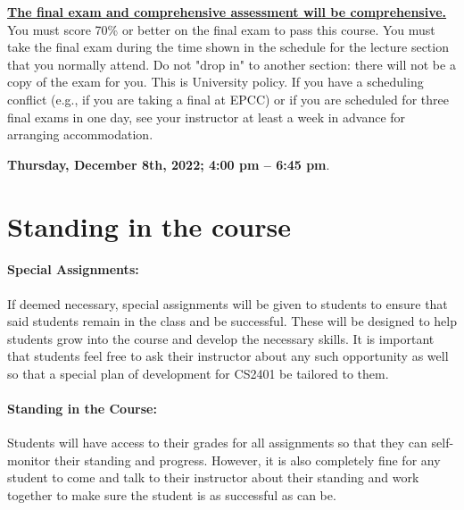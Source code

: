 \documentclass[12pt]{scrartcl}
\begin{document}
\textbf{\underline{The final exam and comprehensive assessment will be comprehensive.}}
You must score 70\% or better on the final exam to pass this course. 
You must take the final exam during the time shown in the schedule for the lecture section that you normally attend. 
Do not "drop in" to another section: there will not be a copy of the exam for you. 
This is University policy. If you have a scheduling conflict (e.g., if you are taking a final at EPCC) or if you are scheduled for three final exams in one day, see your instructor at least a week in advance for arranging accommodation.
\begin{tcolorbox}[colback=green!5,colframe=green!75!black,title=Final Exam Date]
\begin{center}
\textbf{Thursday, December 8th, 2022; 4:00 pm – 6:45 pm}.
 \end{center}
 \end{tcolorbox}

\section{Standing in the course}

\paragraph{Special Assignments:} 
If deemed necessary, special assignments will be given to students to ensure that said students remain in the class and be successful. 
These will be designed to help students grow into the course and develop the necessary skills.
It is important that students feel free to ask their instructor about any such opportunity as well so that a special plan of development for CS2401 be tailored to them.

\paragraph{Standing in the Course:} 

Students will have access to their grades for all assignments so that they can self-monitor their standing and progress. 
However, it is also completely fine for any student to come and talk to their instructor about their standing and work together to make sure the student is as successful as can be.
\end{document}

